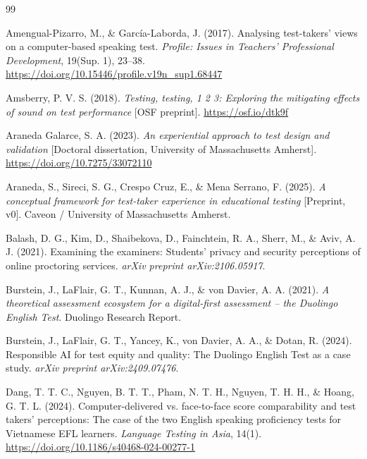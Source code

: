 \documentclass[11pt]{article}
\begin{document}

\begin{thebibliography}{99}

Amengual-Pizarro, M., \& Garc\'ia-Laborda, J. (2017). Analysing test-takers' views on a computer-based speaking test. \textit{Profile: Issues in Teachers' Professional Development}, 19(Sup. 1), 23--38. \url{https://doi.org/10.15446/profile.v19n_sup1.68447}

Amsberry, P. V. S. (2018). \textit{Testing, testing, 1 2 3: Exploring the mitigating effects of sound on test performance} [OSF preprint]. \url{https://osf.io/dtk9f}

Araneda Galarce, S. A. (2023). \textit{An experiential approach to test design and validation} [Doctoral dissertation, University of Massachusetts Amherst]. \url{https://doi.org/10.7275/33072110}

Araneda, S., Sireci, S. G., Crespo Cruz, E., \& Mena Serrano, F. (2025). \textit{A conceptual framework for test-taker experience in educational testing} [Preprint, v0]. Caveon / University of Massachusetts Amherst.

Balash, D. G., Kim, D., Shaibekova, D., Fainchtein, R. A., Sherr, M., \& Aviv, A. J. (2021). Examining the examiners: Students' privacy and security perceptions of online proctoring services. \textit{arXiv preprint arXiv:2106.05917}.

Burstein, J., LaFlair, G. T., Kunnan, A. J., \& von Davier, A. A. (2021). \textit{A theoretical assessment ecosystem for a digital-first assessment -- the Duolingo English Test}. Duolingo Research Report.

Burstein, J., LaFlair, G. T., Yancey, K., von Davier, A. A., \& Dotan, R. (2024). Responsible AI for test equity and quality: The Duolingo English Test as a case study. \textit{arXiv preprint arXiv:2409.07476}.

Dang, T. T. C., Nguyen, B. T. T., Pham, N. T. H., Nguyen, T. H. H., \& Hoang, G. T. L. (2024). Computer-delivered vs. face-to-face score comparability and test takers' perceptions: The case of the two English speaking proficiency tests for Vietnamese EFL learners. \textit{Language Testing in Asia}, 14(1). \url{https://doi.org/10.1186/s40468-024-00277-1}


\end{thebibliography}
\end{document}
